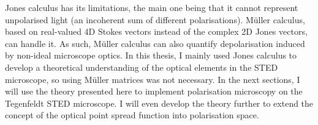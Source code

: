 Jones calculus has its limitations, the main one being that it cannot represent unpolarised light (an incoherent sum of different polarisations). Müller calculus, based on real-valued 4D Stokes vectors instead of the complex 2D Jones vectors, can handle it. As such, Müller calculus can also quantify depolarisation induced by non-ideal microscope optics. In this thesis, I mainly used Jones calculus to develop a theoretical understanding of the optical elements in the STED microscope, so using Müller matrices was not necessary. In the next sections, I will use the theory presented here to implement polarisation microscopy on the Tegenfeldt STED microscope. I will even develop the theory further to extend the concept of the optical point spread function into polarisation space.

